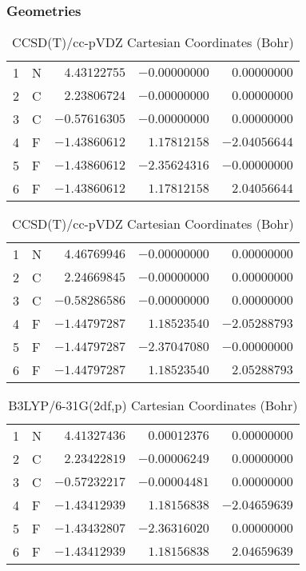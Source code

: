 \documentclass[10pt,oneside]{article}
\begin{document}
\begin{table}[h!]
\subsubsection*{Geometries}
\begin{multicols}{2}
\centering
\caption{CCSD(T)/cc-pVTZ Cartesian Coordinates (Bohr)}
\begin{tabular}{llrrr}
\toprule
1  & N  & $ 4.43122755$ & $-0.00000000$ & $ 0.00000000$ \\
2  & C  & $ 2.23806724$ & $-0.00000000$ & $ 0.00000000$ \\
3  & C  & $-0.57616305$ & $-0.00000000$ & $ 0.00000000$ \\
4  & F  & $-1.43860612$ & $ 1.17812158$ & $-2.04056644$ \\
5  & F  & $-1.43860612$ & $-2.35624316$ & $-0.00000000$ \\
6  & F  & $-1.43860612$ & $ 1.17812158$ & $ 2.04056644$ \\
\bottomrule
\end{tabular}
\caption{CCSD(T)/cc-pVDZ Cartesian Coordinates (Bohr)}
\begin{tabular}{llrrr}
\toprule
1  & N  & $ 4.46769946$ & $-0.00000000$ & $ 0.00000000$ \\
2  & C  & $ 2.24669845$ & $-0.00000000$ & $ 0.00000000$ \\
3  & C  & $-0.58286586$ & $-0.00000000$ & $ 0.00000000$ \\
4  & F  & $-1.44797287$ & $ 1.18523540$ & $-2.05288793$ \\
5  & F  & $-1.44797287$ & $-2.37047080$ & $-0.00000000$ \\
6  & F  & $-1.44797287$ & $ 1.18523540$ & $ 2.05288793$ \\
\bottomrule
\end{tabular}
\end{multicols}
\end{table}

\begin{table}[h]
\centering
\caption{B3LYP/6-31G(2df,p) Cartesian Coordinates (Bohr)}
\begin{tabular}{llrrr}
\toprule
1  & N  & $ 4.41327436$ & $ 0.00012376$ & $ 0.00000000$ \\
2  & C  & $ 2.23422819$ & $-0.00006249$ & $ 0.00000000$ \\
3  & C  & $-0.57232217$ & $-0.00004481$ & $ 0.00000000$ \\
4  & F  & $-1.43412939$ & $ 1.18156838$ & $-2.04659639$ \\
5  & F  & $-1.43432807$ & $-2.36316020$ & $ 0.00000000$ \\
6  & F  & $-1.43412939$ & $ 1.18156838$ & $ 2.04659639$ \\
\bottomrule
\end{tabular}
\end{table}
\end{document}
